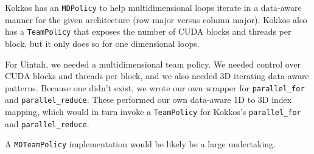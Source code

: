 \documentclass[]{article}
\begin{document}
Kokkos has an \texttt{MDPolicy} to help multidimensional loops iterate in a data-aware manner for the given architecture (row major versus column major).  Kokkos also has a \texttt{TeamPolicy} that exposes the number of CUDA blocks and threads per block, but it only does so for one dimensional loops.

For Uintah, we needed a multidimensional team policy.  We needed control over CUDA blocks and threads per block, and we also needed 3D iterating data-aware patterns. Because one didn't exist, we wrote our own wrapper for \texttt{parallel\_for} and \texttt{parallel\_reduce}.  These performed our own data-aware 1D to 3D index mapping, which would in turn invoke a \texttt{TeamPolicy} for Kokkos's \texttt{parallel\_for} and \texttt{parallel\_reduce}.  

A \texttt{MDTeamPolicy} implementation would be likely be a large undertaking.  
\end{document}
